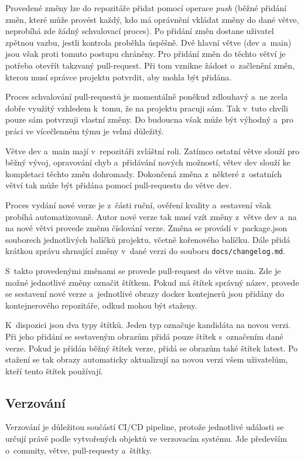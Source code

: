 \documentclass[
  tables=false,
  glossaries,
  index
]{kidiplom}
\begin{document}
Provedené změny lze do repozitáře přidat pomocí operace \emph{push} (běžné přidání změn, které může provést každý, kdo má oprávnění vkládat změny do dané větve, neprobíhá zde žádný schvalovací proces). Po přidání změn dostane uživatel zpětnou vazbu, jestli kontrola proběhla úspěšně. Dvě hlavní větve (dev a~main) jsou však proti tomuto postupu chráněny. Pro přidání změn do těchto větví je potřeba otevřít takzvaný pull-request. Při tom vznikne žádost o~začlenění změn, kterou musí správce projektu potvrdit, aby mohla být přidána.

Proces schvalování pull-requestů je momentálně poněkud zdlouhavý a~ne zcela dobře využitý vzhledem k~tomu, že na projektu pracuji sám. Tak v~tuto chvíli pouze sám potvrzuji vlastní změny. Do budoucna však může být výhodný a~pro práci ve vícečlenném týmu je velmi důležitý.

Větve dev a~main mají v~repozitáři zvláštní roli. Zatímco ostatní větve slouží pro běžný vývoj, opravování chyb a~přidávání nových možností, větev dev slouží ke kompletaci těchto změn dohromady. Dokončená změna z~některé z~ostatních větví tak může být přidána pomocí pull-requestu do větve dev.

Proces vydání nové verze je z~části ruční, ověření kvality a~sestavení však probíhá automatizovaně. Autor nové verze tak musí vzít změny z~větve dev a~na na nové větvi provede změnu číslování verze. Změna se provádí v~package.json souborech jednotlivých balíčků projektu, včetně kořenového balíčku. Dále přidá krátkou zprávu shrnující změny v~dané verzi do souboru \texttt{docs/changelog.md}.

S~takto provedenými změnami se provede pull-request do větve main. Zde je možné jednotlivé změny označit štítkem. Pokud má štítek správný název, provede se sestavení nové verze a~jednotlivé obrazy docker kontejnerů jsou přidány do kontejnerového repozitáře, odkud mohou být staženy.

K~dispozici jsou dva typy štítků. Jeden typ označuje kandidáta na novou verzi. Při jeho přidání se sestaveným obrazům přidá pouze štítek s~označením dané verze. Pokud je přidán běžný štítek verze, přidá se obrazům také štítek latest. Po stažení se tak obrazy automaticky aktualizují na novou verzi všem uživatelům, kteří tento štítek používají.

\subsection{Verzování}
Verzování je důležitou součástí CI/CD pipeline, protože jednotlivé události se určují právě podle vytvořených objektů ve verzovacím systému. Jde především o~commity, větve, pull-requesty a~štítky.
\end{document}
